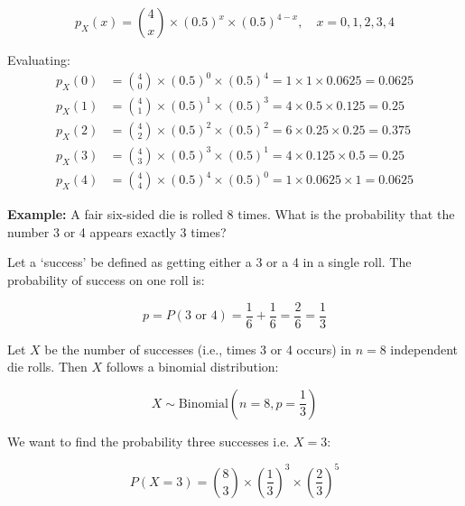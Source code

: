 \documentclass[twoside]{book}
\begin{document}
\[
p_X(x) = \binom{4}{x} \times (0.5)^x \times (0.5)^{4 - x}, \quad x = 0, 1, 2, 3, 4
\]

Evaluating:
\[
\begin{aligned}
p_X(0) &= \binom{4}{0} \times (0.5)^0 \times (0.5)^4 = 1 \times 1 \times 0.0625 = 0.0625 \\
p_X(1) &= \binom{4}{1} \times (0.5)^1 \times (0.5)^3 = 4 \times 0.5 \times 0.125 = 0.25 \\
p_X(2) &= \binom{4}{2} \times (0.5)^2 \times (0.5)^2 = 6 \times 0.25 \times 0.25 = 0.375 \\
p_X(3) &= \binom{4}{3} \times (0.5)^3 \times (0.5)^1 = 4 \times 0.125 \times 0.5 = 0.25 \\
p_X(4) &= \binom{4}{4} \times (0.5)^4 \times (0.5)^0 = 1 \times 0.0625 \times 1 = 0.0625
\end{aligned}
\]


\begin{center}
\end{center}

\textbf{Example:} A fair six-sided die is rolled 8 times. What is the probability that the number 3 or 4 appears exactly 3 times?

Let a `success' be defined as getting either a 3 or a 4 in a single roll. The probability of success on one roll is:

\[
p = P(3 \text{ or } 4) = \frac{1}{6} + \frac{1}{6} = \frac{2}{6} = \frac{1}{3}
\]

Let $X$ be the number of successes (i.e., times 3 or 4 occurs) in $n = 8$ independent die rolls. Then $X$ follows a binomial distribution:

\[
X \sim \text{Binomial}\left(n =8, p = \frac{1}{3}\right)
\]

We want to find the probability three successes i.e. $X = 3$:

\[
P(X = 3) = \binom{8}{3} \times \left( \frac{1}{3} \right)^3 \times \left( \frac{2}{3} \right)^5
\]
\end{document}
